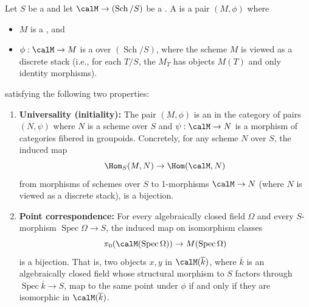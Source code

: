 \begin{definition} \label{definition:moduli_space_for_a_moduli_problem_on_schemes}
    Let $S$ be a  and let $\calM \to (\operatorname{Sch}/S)$ be a . A  is a pair $(M, \phi)$ where
    \begin{itemize}
        \item $M$ is a , and
        \item $\phi: \calM \to M$ is a   over $(\operatorname{Sch}/S)$, where the scheme $M$ is viewed as a discrete stack (i.e., for each $T/S$, the  $M_T$ has objects $M(T)$ and only identity morphisms).
    \end{itemize}
    satisfying the following two properties:

    \begin{enumerate}
        \item \textbf{Universality (initiality):} The pair $(M, \phi)$ is an  in the category of pairs $(N, \psi)$ where $N$ is a scheme over $S$ and $\psi: \calM \to N$ is a morphism of categories fibered in groupoids. Concretely, for any scheme $N$ over $S$, the induced map
        $$\Hom_{S}(M, N) \to \Hom(\calM, N)$$
        from morphisms of schemes over $S$ to 1-morphisms $\calM \to N$ (where $N$ is viewed as a discrete stack), is a bijection.

        \item \textbf{Point correspondence:} For every algebraically closed field $\Omega$ and every $S$-morphism $\operatorname{Spec}\Omega \to S$, the induced map on isomorphism classes
        $$\pi_0(\calM(\operatorname{Spec}\Omega)) \to M(\operatorname{Spec}\Omega)$$
        is a bijection. That is, two objects $x, y$ in $\calM(\overline{k})$, where $\overline{k}$ is an algebraically closed field whose structural morphism to $S$ factors through $\operatorname{Spec}\overline{k} \to S$, map to the same point under $\phi$ if and only if they are isomorphic in $\calM(\overline{k})$.
    \end{enumerate}


\end{definition}
